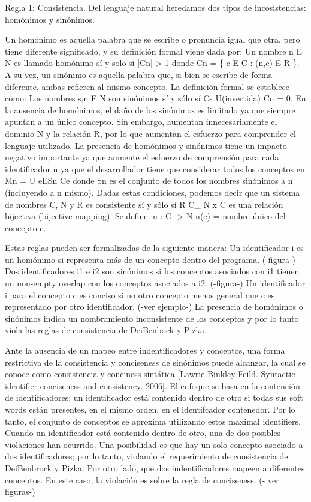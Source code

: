 Regla 1: Consistencia. Del lenguaje natural heredamos dos tipos de incosistencias: homónimos y sinónimos.

Un homónimo es aquella palabra que se escribe o pronuncia igual que otra, pero tiene diferente significado, y su definición formal viene dada por:
Un nombre n E N es llamado homónimo sí y solo sí |Cn| > 1 donde Cn = \{ c E C : (n,c) E R \}.
A su vez, un sinónimo es aquella palabra que, si bien se escribe de forma diferente, ambas refieren al mismo concepto. La definición formal se establece como:
Los nombres s,n E N son sinónimos sí y sólo sí Cs U(invertida) Cn =\/ 0.
En la ausencia de homónimos, el daño de los sinónimos es limitado ya que siempre apuntan a un único concepto. Sin embargo, aumentan innecesariamente el dominio N y la relación R, por lo que aumentan el esfuerzo para comprender el lenguaje utilizado. La presencia de homónimos y sinónimos tiene un impacto negativo importante ya que aumente el esfuerzo de comprensión para cada identificador n ya que el desarrollador tiene que considerar todos los conceptos en
Mn = U eESn Ce
donde Sn es el conjunto de todos los nombres sinónimos a n (incluyendo a n mismo).
Dadas estas condiciones, podemos decir que un sistema de nombres C, N y R es consistente sí y sólo sí R C\_ N x C es una relación bijectiva (bijective mapping). Se define:
n : C -> N
n(c) = nombre único del concepto c.

Estas reglas pueden ser formalizadas de la siguiente manera:
Un identificador i es un homónimo si representa más de un concepto dentro del programa. (-figura-)
Dos identificadores i1 e i2 son sinónimos si los conceptos asociados con i1 tienen un non-empty overlap con los conceptos asociados a i2. (-figura-)
Un identificador i para el concepto c es conciso si no otro concepto menos general que c es representado por otro identificador. (-ver ejemplo-)
La presencia de homónimos o sinónimos indica un nombramiento inconsistente de los conceptos y por lo tanto viola las reglas de consistencia de DeiBenbock y Pizka.

Ante la ausencia de un mapeo entre indentificadores y conceptos, una forma restrictiva de la consistencia y conciseness de sinónimos puede alcanzar, la cual se conoce como consistencia y conciness sintática [Lawrie Binkley Feild. Syntactic identifier conciseness and consistency. 2006]. 
El enfoque se basa en la contención de identificadores: un identificador está contenido dentro de otro si todas sus soft words están presentes, en el mismo orden, en el identifcador contenedor. 
Por lo tanto, el conjunto de conceptos se aproxima utilizando estos maximal identifiers.
Cuando un identificador está contenido dentro de otro, una de dos posibles violaciones han ocurrido. Una posibilidad es que hay un solo concepto asociado a dos identificadores; por lo tanto, violando el requerimiento de consistencia de DeiBenbrock y Pizka. Por otro lado, que dos indentificadores mapeen a diferentes conceptos. En este caso, la violación es sobre la regla de conciseness. (- ver figuras-)

